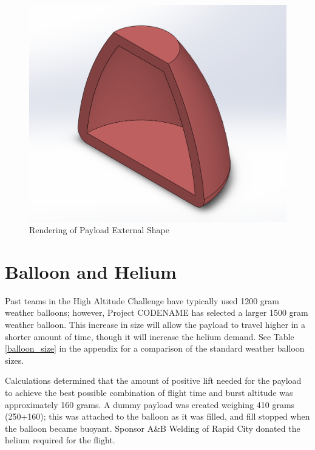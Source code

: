 \documentclass[english]{report}
\begin{document}
\begin{figure}[H]
\begin{centering}
\includegraphics[scale=0.5]{./images/shape}
\par\end{centering}
\caption{Rendering of Payload External Shape}

\end{figure}


\newpage
\section{Balloon and Helium}
Past teams in the High Altitude Challenge have typically used 1200 gram weather balloons; however, Project CODENAME has selected a larger 1500 gram weather balloon.  This increase in size will allow the payload to travel higher in a shorter amount of time, though it will increase the helium demand.  See Table \ref{balloon_size} in the appendix for a comparison of the standard weather balloon sizes\cite{balloon-performance-calculator}.


Calculations determined that the  amount of positive lift needed for the payload to achieve the best possible combination of flight time and burst altitude was approximately 160 grams.  A dummy payload was created weighing 410 grams (250+160); this was attached to the balloon as it was filled, and fill stopped when the balloon became buoyant.  Sponsor A\&B Welding of Rapid City donated the helium required for the flight.
\end{document}
